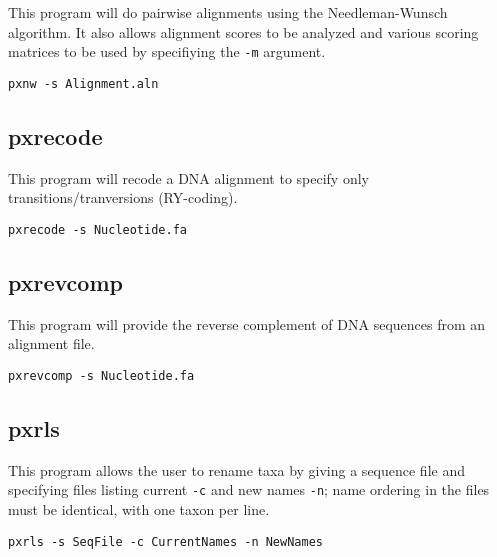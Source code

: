 \documentclass[12pt,letterpaper]{memoir}
\begin{document}
This program will do pairwise alignments using the Needleman-Wunsch algorithm. It also allows alignment scores to be analyzed and various scoring matrices to be used by specifiying the \texttt{-m} argument.

\begin{flushleft}
\begin{verbatim}
pxnw -s Alignment.aln
\end{verbatim}
\end{flushleft}

\subsection{pxrecode}

This program will recode a DNA alignment to specify only transitions/tranversions (RY-coding).

\begin{flushleft}
\begin{verbatim}
pxrecode -s Nucleotide.fa
\end{verbatim}
\end{flushleft}

\subsection{pxrevcomp}

This program will provide the reverse complement of DNA sequences from an alignment file.

\begin{flushleft}
\begin{verbatim}
pxrevcomp -s Nucleotide.fa
\end{verbatim}
\end{flushleft}

\subsection{pxrls}

This program allows the user to rename taxa by giving a sequence file and specifying files listing current \texttt{-c} and new names \texttt{-n}; name ordering in the files must be identical, with one taxon per line.

\begin{flushleft}
\begin{verbatim}
pxrls -s SeqFile -c CurrentNames -n NewNames
\end{verbatim}
\end{flushleft}
\end{document}
